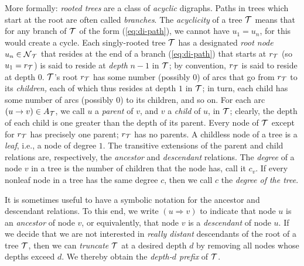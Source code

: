 More formally: {\em rooted trees} are a class of {\em acyclic}
digraphs.  Paths in trees which start at the root are often called
{\em branches}.  The {\em acyclicity} of a tree $\mbox{$\cal T$}$ means that for
any branch of $\mbox{$\cal T$}$ of the form (\ref{eq:di-path}), we cannot have $u_1
= u_n$, for this would create a cycle.  Each singly-rooted tree $\mbox{$\cal T$}$
has a designated {\em root node}  $u_n \in
\mbox{$\cal N$}_{\mbox{{\scriptsize $\cal T$}}}$ that resides at the end of a branch (\ref{eq:di-path}) that
starts at $r_{\mbox{{\scriptsize $\cal T$}}}$ (so $u_1 = r_{\mbox{{\scriptsize $\cal T$}}}$) is said to reside at {\em
  depth} $n-1$ in $\mbox{$\cal T$}$; by convention, $r_{\mbox{{\scriptsize $\cal T$}}}$ is said to reside at
depth $0$.   $\mbox{$\cal T$}$'s
root $r_{\mbox{{\scriptsize $\cal T$}}}$ has some number (possibly $0$) of arcs that go from
$r_{\mbox{{\scriptsize $\cal T$}}}$ to its {\em children,} each of which thus resides at depth
$1$ in $\mbox{$\cal T$}$; in turn, each child has some number of arcs (possibly
$0$) to its children, and so on.  For each arc $(u \rightarrow v) \in
A_{\mbox{{\scriptsize $\cal T$}}}$, we call $u$ a {\it parent}  of $v$,
and $v$ a {\it child}  of $u$, in $\mbox{$\cal T$}$;
clearly, the depth of each child is one greater than the depth of its
parent.  Every node of $\mbox{$\cal T$}$ except for $r_{\mbox{{\scriptsize $\cal T$}}}$ has precisely one
parent; $r_{\mbox{{\scriptsize $\cal T$}}}$ has no parents.  A childless node of a tree is a
{\em leaf},  i.e., a node of degree $1$.  The
transitive extensions of the parent and child relations are,
respectively, the {\em ancestor}  and {\em
  descendant}  relations.  The {\em
  degree}  of a node $v$ in a tree
is the number of children that the node has, call it $c_v$.  If every
nonleaf node in a tree has the same degree $c$, then we call $c$ the
{\em degree of the tree}.  

It is sometimes useful to have a symbolic notation for the ancestor
and descendant relations.  To this end, we write $(u \Rightarrow v)$
 to
indicate that node $u$ is an {\it ancestor} of node $v$, or
equivalently, that node $v$ is a {\it descendant} of node $u$.  If we
decide that we are not interested in {\em really distant} descendants
of the root of a tree $\mbox{$\cal T$}$, then we can {\em truncate} 
$\mbox{$\cal T$}$ at a desired depth $d$ by removing all nodes whose depths exceed
$d$.  We thereby obtain the {\em depth-$d$ prefix} of $\mbox{$\cal T$}$.

